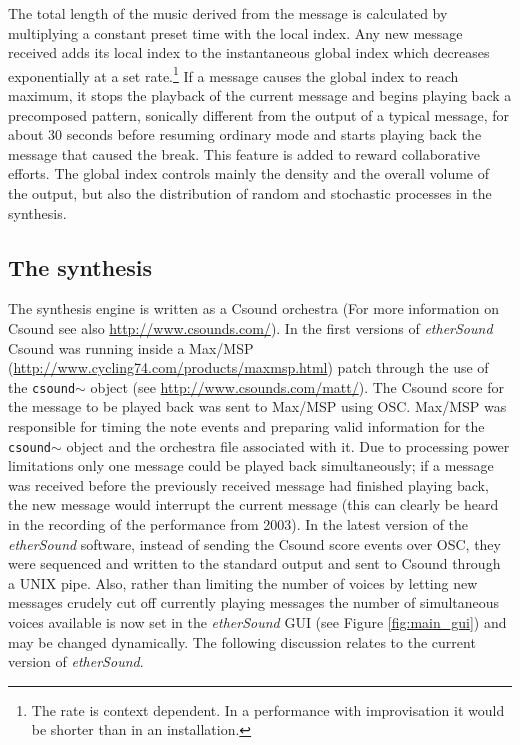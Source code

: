   The total length of the music derived from the message is calculated   by multiplying a constant preset time with the local index. Any new   message received adds its local index to the instantaneous global   index which decreases exponentially at a set rate.\footnote{The rate     is context dependent. In a performance with improvisation it would     be shorter than in an installation.} If a message causes the   global index to reach maximum, it stops the playback of the current   message and begins playing back a precomposed pattern, sonically   different from the output of a typical message, for about 30 seconds   before resuming ordinary mode and starts playing back the message   that caused the break. This feature is added to reward collaborative   efforts. The global index controls mainly the density and the   overall volume of the output, but also the distribution of random   and stochastic processes in the synthesis. 

\subsection{The synthesis}

The synthesis engine is written as a Csound orchestra \citep{csound} (For more information on Csound see also \url{http://www.csounds.com/}). In the first versions of \emph{etherSound} Csound was running inside a Max/MSP (\url{http://www.cycling74.com/products/maxmsp.html}) patch through the use of the \texttt{csound$\sim$} object (see \url{http://www.csounds.com/matt/}). The Csound score for the message to be played back was sent to Max/MSP using OSC. Max/MSP was responsible for timing the note events and preparing valid information for the \texttt{csound$\sim$} object and the orchestra file associated with it. Due to processing power limitations only one message could be played back simultaneously; if a message was received before the previously received message had finished playing back, the new message would interrupt the current message (this can clearly be heard in the recording of the performance from 2003). In the latest version of the \emph{etherSound} software, instead of sending the Csound score events over OSC, they were sequenced and written to the standard output and sent to Csound through a UNIX pipe. Also, rather than limiting the number of voices by letting new messages crudely cut off currently playing messages the number of simultaneous voices available is now set in the \emph{etherSound} GUI (see Figure \ref{fig:main_gui}) and may be changed dynamically. The following discussion relates to the current version of \emph{etherSound}. 

